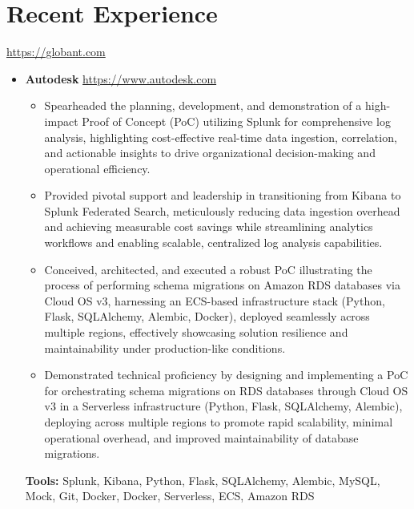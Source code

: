 \documentclass[11pt,a4paper,english]{moderncv}
\begin{document}
\maketitle

\section{Recent Experience}

{
\url{https://globant.com}
\newline{}
\begin{itemize}
    \item \textbf{Autodesk}
        \newline{}
        \url{https://www.autodesk.com}
        \begin{itemize}
            \item Spearheaded the planning, development, and demonstration of a high-impact Proof of Concept (PoC) utilizing Splunk for comprehensive log analysis, highlighting cost-effective real-time data ingestion, correlation, and actionable insights to drive organizational decision-making and operational efficiency.
            \item Provided pivotal support and leadership in transitioning from Kibana to Splunk Federated Search, meticulously reducing data ingestion overhead and achieving measurable cost savings while streamlining analytics workflows and enabling scalable, centralized log analysis capabilities.
            \item Conceived, architected, and executed a robust PoC illustrating the process of performing schema migrations on Amazon RDS databases via Cloud OS v3, harnessing an ECS-based infrastructure stack (Python, Flask, SQLAlchemy, Alembic, Docker), deployed seamlessly across multiple regions, effectively showcasing solution resilience and maintainability under production-like conditions.
            \item Demonstrated technical proficiency by designing and implementing a PoC for orchestrating schema migrations on RDS databases through Cloud OS v3 in a Serverless infrastructure (Python, Flask, SQLAlchemy, Alembic), deploying across multiple regions to promote rapid scalability, minimal operational overhead, and improved maintainability of database migrations.
        \end{itemize}
        \textbf{Tools:} Splunk, Kibana, Python, Flask, SQLAlchemy, Alembic, MySQL, Mock, Git, Docker, Docker, Serverless, ECS, Amazon RDS
\end{itemize}
}
\end{document}
